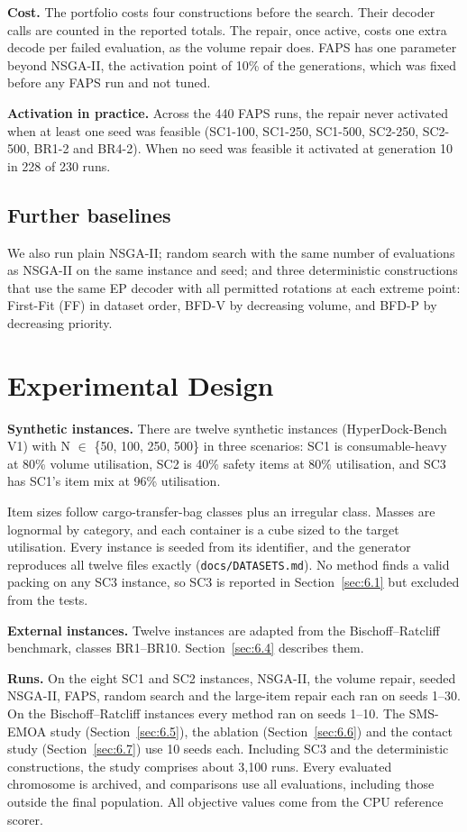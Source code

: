 \documentclass[journal]{IEEEtran}
\begin{document}
\textbf{Cost.} The portfolio costs four constructions before the search. Their decoder calls are counted in the reported totals. The repair, once active, costs one extra decode per failed evaluation, as the volume repair does. FAPS has one parameter beyond NSGA-II, the activation point of 10\% of the generations, which was fixed before any FAPS run and not tuned.

\textbf{Activation in practice.} Across the 440 FAPS runs, the repair never activated when at least one seed was feasible (SC1-100, SC1-250, SC1-500, SC2-250, SC2-500, BR1-2 and BR4-2). When no seed was feasible it activated at generation 10 in 228 of 230 runs.

\subsection{Further baselines}\label{sec:3.6}

We also run plain NSGA-II; random search with the same number of evaluations as NSGA-II on the same instance and seed; and three deterministic constructions that use the same EP decoder with all permitted rotations at each extreme point: First-Fit (FF) in dataset order, BFD-V by decreasing volume, and BFD-P by decreasing priority.

\section{Experimental Design}\label{sec:4}

\textbf{Synthetic instances.} There are twelve synthetic instances (HyperDock-Bench V1) with N \(\in\) \{50, 100, 250, 500\} in three scenarios: SC1 is consumable-heavy at 80\% volume utilisation, SC2 is 40\% safety items at 80\% utilisation, and SC3 has SC1's item mix at 96\% utilisation.

Item sizes follow cargo-transfer-bag classes plus an irregular class. Masses are lognormal by category, and each container is a cube sized to the target utilisation. Every instance is seeded from its identifier, and the generator reproduces all twelve files exactly (\texttt{docs/DATASETS.md}). No method finds a valid packing on any SC3 instance, so SC3 is reported in Section~\ref{sec:6.1} but excluded from the tests.

\textbf{External instances.} Twelve instances are adapted from the Bischoff--Ratcliff benchmark, classes BR1--BR10. Section~\ref{sec:6.4} describes them.

\textbf{Runs.} On the eight SC1 and SC2 instances, NSGA-II, the volume repair, seeded NSGA-II, FAPS, random search and the large-item repair each ran on seeds 1--30. On the Bischoff--Ratcliff instances every method ran on seeds 1--10. The SMS-EMOA study (Section~\ref{sec:6.5}), the ablation (Section~\ref{sec:6.6}) and the contact study (Section~\ref{sec:6.7}) use 10 seeds each. Including SC3 and the deterministic constructions, the study comprises about 3,100 runs. Every evaluated chromosome is archived, and comparisons use all evaluations, including those outside the final population. All objective values come from the CPU reference scorer.
\end{document}

